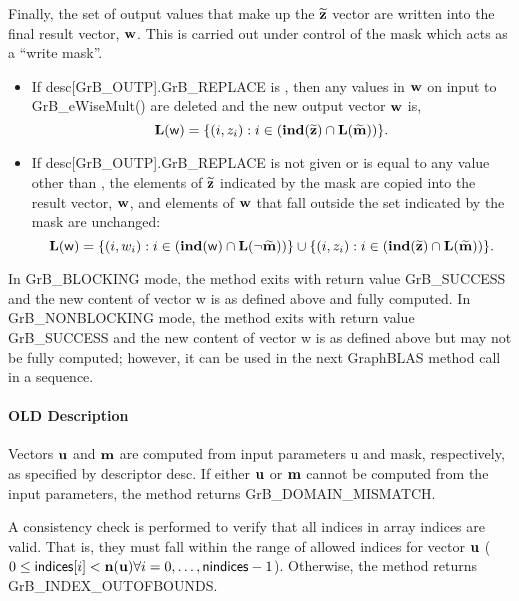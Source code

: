 Finally, the set of output values that make up the ${\bf \widetilde{z}}$ 
vector are written into the final result vector, ${\bf w}$. 
This is carried out under control of the mask which acts as a ``write mask''.
\begin{itemize}
\item If {\sf desc[GrB\_OUTP].GrB\_REPLACE} is \true, then any values in ${\bf w}$ 
on input to {\sf GrB\_eWiseMult()} are deleted and the new output vector ${\bf w}$ is,
\[ \bold{L}({\sf w}) = \{(i,z_{i}) : i \in (\bold{ind}({\bf \widetilde{z}}) 
\cap \bold{L}({\bf \widetilde{m}})) \}. \]

\item If {\sf desc[GrB\_OUTP].GrB\_REPLACE} is not given or is equal to any 
value other than \true, the elements of ${\bf \widetilde{z}}$ indicated by 
the mask are copied into the result vector, ${\bf w}$, and elements of 
${\bf w}$ that fall outside the set indicated by the mask are unchanged:
\[ \bold{L}({\sf w}) = \{(i,w_{i}) : i \in (\bold{ind}({\bf \sf w}) 
\cap \bold{L}(\neg {\bf \widetilde{m}})) \} \cup \{(i,z_{i}) : i \in 
(\bold{ind}({\bf \widetilde{z}}) \cap \bold{L}({\bf \widetilde{m}})) \}. \]
\end{itemize}

In {\sf GrB\_BLOCKING} mode, the method exits with return value 
{\sf GrB\_SUCCESS} and the new content of vector {\sf w} is as defined above
and fully computed.  
In {\sf GrB\_NONBLOCKING} mode, the method exits with return value 
{\sf GrB\_SUCCESS} and the new content of vector {\sf w} is as defined above 
but may not be fully computed; however, it can be used in the next GraphBLAS 
method call in a sequence.


\paragraph{OLD Description}

Vectors ${\bf u}$ and ${\bf m}$ are computed from input
parameters {\sf u} and {\sf mask}, respectively, as specified by
descriptor {\sf desc}.  If either ${\bf u}$ or ${\bf m}$
cannot be computed from the input parameters, the method returns {\sf
GrB\_DOMAIN\_MISMATCH}.

A consistency check is performed to verify that all indices in array
{\sf indices} are valid. That is, they must fall within the range of allowed
indices for vector ${\bf u}$ ($0 \leq {\sf indices}[i] < \bold{n}({\bf u})
\forall i = 0,\ldots,{\sf nindices}-1$).  Otherwise, the method returns {\sf
GrB\_INDEX\_OUTOFBOUNDS}.

